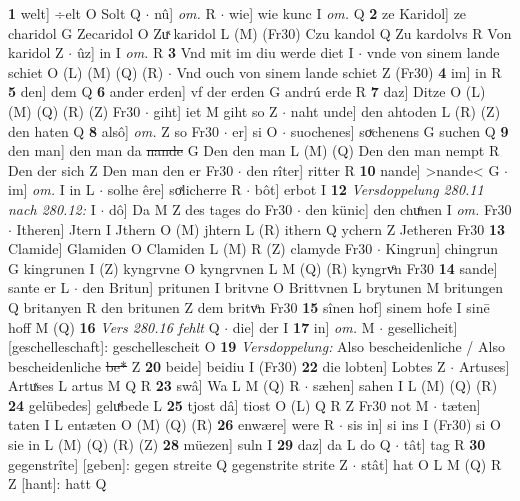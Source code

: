 \documentclass[8pt,a4paper,notitlepage]{article}
\begin{document}
\begin{table}[ht]
\begin{minipage}[t]{0.5\linewidth}
\textbf{1} welt] ÷elt O Solt Q  $\cdot$ nû] \textit{om.} R  $\cdot$ wie] wie kunc I \textit{om.} Q \textbf{2} ze Karidol] ze charidol G Zecaridol O Zuͯ karidol L (M) (Fr30) Czu kandol Q Zu kardolvs R Von karidol Z  $\cdot$ ûz] in I \textit{om.} R \textbf{3} Vnd mit im diu werde diet I  $\cdot$ vnde von sinem lande schiet O (L) (M) (Q) (R)  $\cdot$ Vnd ouch von sinem lande schiet Z (Fr30) \textbf{4} im] in R \textbf{5} den] dem Q \textbf{6} ander erden] vf der erden G andrú erde R \textbf{7} daz] Ditze O (L) (M) (Q) (R) (Z) Fr30  $\cdot$ giht] iet M giht so Z  $\cdot$ naht unde] den ahtoden L (R) (Z) den haten Q \textbf{8} alsô] \textit{om.} Z so Fr30  $\cdot$ er] si O  $\cdot$ suochenes] soͮchenens G suchen Q \textbf{9} den man] den man da \sout{nande} G Den den man L (M) (Q) Den den man nempt R Den der sich Z Den man den er Fr30  $\cdot$ den rîter] ritter R \textbf{10} nande] >nande< G  $\cdot$ im] \textit{om.} I in L  $\cdot$ solhe êre] soͯlicherre R  $\cdot$ bôt] erbot I \textbf{12} \textit{Versdoppelung 280.11 nach 280.12:} I   $\cdot$ dô] Da M Z des tages do Fr30  $\cdot$ den künic] den chuͤnen I \textit{om.} Fr30  $\cdot$ Itheren] Jtern I Jthern O (M) jhtern L (R) ithern Q ychern Z Jetheren Fr30 \textbf{13} Clamide] Glamiden O Clamiden L (M) R (Z) clamyde Fr30  $\cdot$ Kingrun] chingrun G kingrunen I (Z) kyngrvne O kyngrvnen L M (Q) (R) kyngrvͦn Fr30 \textbf{14} sande] sante er L  $\cdot$ den Britun] pritunen I britvne O Brittvnen L brytunen M britungen Q britanyen R den britunen Z dem britvͦn Fr30 \textbf{15} sînen hof] sinem hofe I sinē hoff M (Q) \textbf{16} \textit{Vers 280.16 fehlt} Q   $\cdot$ die] der I \textbf{17} in] \textit{om.} M  $\cdot$ gesellicheit] [geschelleschaft]: geschellescheit O \textbf{19} \textit{Versdoppelung:} Also bescheidenliche / Also bescheidenliche \sout{be*} Z  \textbf{20} beide] beidiu I (Fr30) \textbf{22} die lobten] Lobtes Z  $\cdot$ Artuses] Artuͯses L artus M Q R \textbf{23} swâ] Wa L M (Q) R  $\cdot$ sæhen] sahen I L (M) (Q) (R) \textbf{24} gelübedes] geluͯbede L \textbf{25} tjost dâ] tiost O (L) Q R Z Fr30 not M  $\cdot$ tæten] taten I L entæten O (M) (Q) (R) \textbf{26} enwære] were R  $\cdot$ sis in] si ins I (Fr30) si O sie in L (M) (Q) (R) (Z) \textbf{28} müezen] suln I \textbf{29} daz] da L do Q  $\cdot$ tât] tag R \textbf{30} gegenstrîte] [geben]: gegen streite Q gegenstrite strite Z  $\cdot$ stât] hat O L M (Q) R Z [hant]: hatt Q \newline
\end{minipage}
\hspace{0.5cm}
\begin{minipage}[t]{0.5\linewidth}

\end{minipage}
\end{table}
\end{document}
